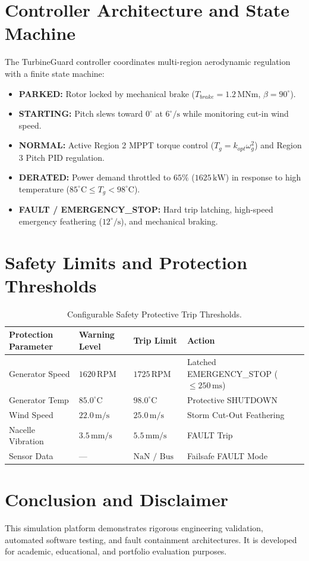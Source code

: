 \documentclass[11pt,a4paper]{article}
\begin{document}
\section{Controller Architecture and State Machine}
The TurbineGuard controller coordinates multi-region aerodynamic regulation with a finite state machine:
\begin{itemize}
    \item \textbf{PARKED:} Rotor locked by mechanical brake ($T_{brake} = 1.2\,\text{MNm}$, $\beta = 90^\circ$).
    \item \textbf{STARTING:} Pitch slews toward $0^\circ$ at $6^\circ/\text{s}$ while monitoring cut-in wind speed.
    \item \textbf{NORMAL:} Active Region 2 MPPT torque control ($T_g = k_{opt} \omega_g^2$) and Region 3 Pitch PID regulation.
    \item \textbf{DERATED:} Power demand throttled to $65\%$ ($1625\,\text{kW}$) in response to high temperature ($85^\circ\text{C} \le T_g < 98^\circ\text{C}$).
    \item \textbf{FAULT / EMERGENCY\_STOP:} Hard trip latching, high-speed emergency feathering ($12^\circ/\text{s}$), and mechanical braking.
\end{itemize}

\section{Safety Limits and Protection Thresholds}
\begin{table}[h]
\centering
\begin{tabular}{@{}llll@{}}
\toprule
\textbf{Protection Parameter} & \textbf{Warning Level} & \textbf{Trip Limit} & \textbf{Action} \\ \midrule
Generator Speed & $1620\,\text{RPM}$ & $1725\,\text{RPM}$ & Latched EMERGENCY\_STOP ($\le 250\,\text{ms}$) \\
Generator Temp & $85.0^\circ\text{C}$ & $98.0^\circ\text{C}$ & Protective SHUTDOWN \\
Wind Speed & $22.0\,\text{m/s}$ & $25.0\,\text{m/s}$ & Storm Cut-Out Feathering \\
Nacelle Vibration & $3.5\,\text{mm/s}$ & $5.5\,\text{mm/s}$ & FAULT Trip \\
Sensor Data & --- & $\text{NaN / Bus Loss}$ & Failsafe FAULT Mode \\ \bottomrule
\end{tabular}
\caption{Configurable Safety Protective Trip Thresholds.}
\end{table}

\section{Conclusion and Disclaimer}
This simulation platform demonstrates rigorous engineering validation, automated software testing, and fault containment architectures. It is developed for academic, educational, and portfolio evaluation purposes.
\end{document}
